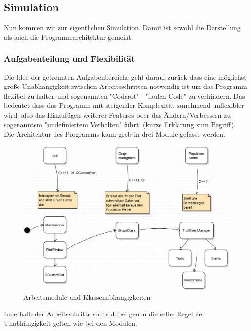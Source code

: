 \documentclass{article}
\begin{document}
	
	\subsection{Simulation}
	Nun kommen wir zur eigentlichen Simulation. Damit ist sowohl die Darstellung als auch die Programmarchitektur gemeint. 
		\subsubsection{Aufgabenteilung und Flexibilität}
		Die Idee der getrennten Aufgabenbereiche geht darauf zurück dass eine möglichst große Unabhängigkeit zwischen Arbeitsschritten notwendig ist um das Programm flexibel zu halten und sogenannten "{}Coderot"{} - "{}faulen Code"{} zu verhindern. Das bedeutet dass das Programm mit steigender Komplexität zunehmend unflexibler wird, also das Hinzufügen weiterer Features oder das Ändern/Verbessern zu sogenanntem "{}undefiniertem Verhalten"{} führt. (kurze Erklärung zum Begriff).\\
		Die Architektur des Programms kann grob in drei Module gefasst werden. 
		\begin{figure}[H]
			\centering
			\includegraphics[width=0.7\linewidth]{./Bild_Module}
			\caption[Module]{Arbeitsmodule und Klassenabhängigkeiten}
			\label{Module und Klassen}
		\end{figure}
		Innerhalb der Arbeitsschritte sollte dabei genau die selbe Regel der Unabhängigkeit gelten wie bei den Modulen.
		
\end{document}
